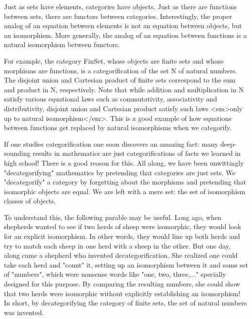 Just as sets have elements, categories have objects.  Just as there
are functions between sets, there are functors between categories.
Interestingly, the proper analog of an equation between elements is
not an equation between objects, but an isomorphism.  More generally,
the analog of an equation between functions is a natural isomorphism
between functors.

For example, the category FinSet, whose objects are finite sets and
whose morphisms are functions, is a categorification of the set N of
natural numbers.   The disjoint union and Cartesian product of finite
sets correspond to the sum and product in N, respectively.  Note that
while addition and multiplication in N satisfy various equational
laws such as commutativity, associativity and distributivity, disjoint
union and Cartesian product satisfy such laws <em>only up to natural
isomorphism</em>.  This is a good example of how equations between functions
get replaced by natural isomorphisms when we categorify.

If one studies categorification one soon discovers an amazing fact: many
deep-sounding results in mathematics are just categorifications of facts
we learned in high school!  There is a good reason for this.  All along,
we have been unwittingly "decategorifying" mathematics by pretending
that categories are just sets.  We "decategorify" a category by
forgetting about the morphisms and pretending that isomorphic objects
are equal.  We are left with a mere set: the set of isomorphism classes
of objects. 

To understand this, the following parable may be useful.  Long ago, when
shepherds wanted to see if two herds of sheep were isomorphic, they
would look for an explicit isomorphism.  In other words, they would line
up both herds and try to match each sheep in one herd with a sheep in
the other.  But one day, along came a shepherd who invented
decategorification.  She realized one could take each herd and
"count"
it, setting up an isomorphism between it and some set of "numbers",
which were nonsense words like "one, two, three,..." specially
designed for this purpose.  By comparing the resulting numbers, she
could show that two herds were isomorphic without explicitly
establishing an isomorphism!  In short, by decategorifying the category
of finite sets, the set of natural numbers was invented.   

